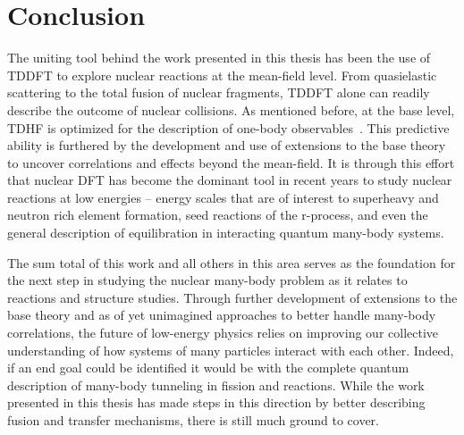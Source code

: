 

\section{Conclusion}
\label{sec:future_work_conclusion}
The uniting tool behind the work presented in this thesis has been the use of TDDFT to explore nuclear reactions at the mean-field level.
From quasielastic scattering to the total fusion of nuclear fragments, TDDFT alone can readily describe the outcome of nuclear collisions.
As mentioned before, at the base level, TDHF is optimized for the description of one-body observables~\citep{balian1981}.
This predictive ability is furthered by the development and use of extensions to the base theory to uncover correlations and effects beyond the mean-field.
It is through this effort that nuclear DFT has become the dominant tool in recent years to study nuclear reactions at low energies -- energy scales that are of interest to superheavy and neutron rich element formation, seed reactions of the r-process, and even the general description of equilibration in interacting quantum many-body systems.

The sum total of this work and all others in this area serves as the foundation for the next step in studying the nuclear many-body problem as it relates to reactions and structure studies.
Through further development of extensions to the base theory and as of yet unimagined approaches to better handle many-body correlations, the future of low-energy physics relies on improving our collective understanding of how systems of many particles interact with each other.
Indeed, if an end goal could be identified it would be with the complete quantum description of many-body tunneling in fission and reactions.
While the work presented in this thesis has made steps in this direction by better describing fusion and transfer mechanisms, there is still much ground to cover.